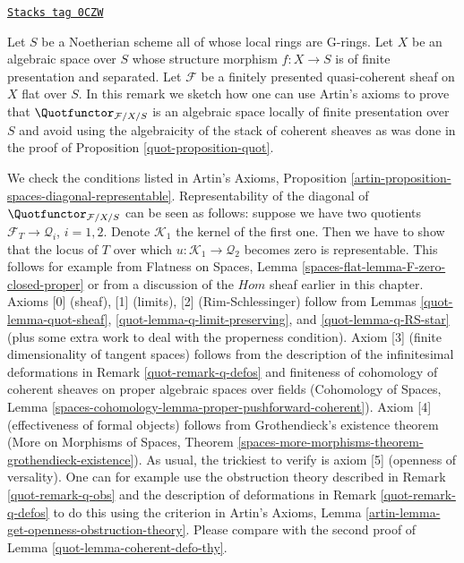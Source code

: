 \begin{remark}

\label{quot-remark-quot-via-artins-axioms}
\href{https://stacks.math.columbia.edu/tag/0CZW}{\texttt{Stacks tag 0CZW}}

Let $S$ be a Noetherian scheme all of whose local rings are G-rings.
Let $X$ be an algebraic space over $S$ whose structure morphism
$f : X \to S$ is of finite presentation and separated.
Let $\mathcal{F}$ be a finitely presented quasi-coherent sheaf
on $X$ flat over $S$. In this remark we sketch how one can
use Artin's axioms to prove that $\Quotfunctor_{\mathcal{F}/X/S}$
is an algebraic space locally of finite presentation over $S$
and avoid using the algebraicity of the stack of coherent sheaves
as was done in the proof of Proposition \ref{quot-proposition-quot}.

\medskip\noindent
We check the conditions listed in Artin's Axioms, Proposition
\ref{artin-proposition-spaces-diagonal-representable}.
Representability of the diagonal of $\Quotfunctor_{\mathcal{F}/X/S}$
can be seen as follows: suppose we have two quotients
$\mathcal{F}_T \to \mathcal{Q}_i$, $i = 1, 2$. Denote
$\mathcal{K}_1$ the kernel of the first one. Then we have
to show that the locus of $T$ over which
$u : \mathcal{K}_1 \to \mathcal{Q}_2$ becomes zero is representable.
This follows for example from Flatness on Spaces, Lemma
\ref{spaces-flat-lemma-F-zero-closed-proper}
or from a discussion of the $\mathit{Hom}$ sheaf earlier
in this chapter. Axioms [0] (sheaf), [1] (limits), [2] (Rim-Schlessinger)
follow from Lemmas \ref{quot-lemma-quot-sheaf},
\ref{quot-lemma-q-limit-preserving}, and \ref{quot-lemma-q-RS-star}
(plus some extra work to deal with the properness condition).
Axiom [3] (finite dimensionality of tangent spaces)
follows from the description of the infinitesimal
deformations in Remark \ref{quot-remark-q-defos}
and finiteness of cohomology of coherent sheaves on proper
algebraic spaces over fields (Cohomology of Spaces, Lemma
\ref{spaces-cohomology-lemma-proper-pushforward-coherent}).
Axiom [4] (effectiveness of formal objects)
follows from Grothendieck's existence theorem
(More on Morphisms of Spaces, Theorem
\ref{spaces-more-morphisms-theorem-grothendieck-existence}).
As usual, the trickiest to verify is axiom [5] (openness of versality).
One can for example use the obstruction theory described
in Remark \ref{quot-remark-q-obs} and the description of
deformations in Remark \ref{quot-remark-q-defos}
to do this using the criterion in
Artin's Axioms, Lemma \ref{artin-lemma-get-openness-obstruction-theory}.
Please compare with the second proof of
Lemma \ref{quot-lemma-coherent-defo-thy}.
\end{remark}

